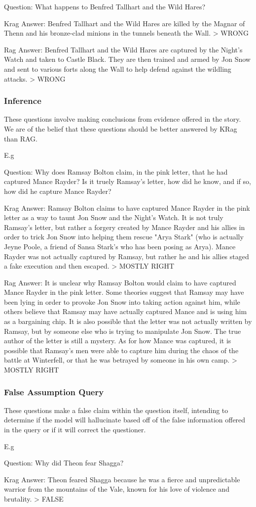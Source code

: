 Question: What happens to Benfred Tallhart and the Wild Hares?\par
Krag Answer:  Benfred Tallhart and the Wild Hares are killed by the Magnar of Thenn and his bronze-clad minions in the tunnels beneath the Wall.
> WRONG

Rag Answer:  Benfred Tallhart and the Wild Hares are captured by the Night's Watch and taken to Castle Black. They are then trained and armed by Jon Snow and sent to various forts along the Wall to help defend against the wildling attacks.
> WRONG

\subsubsection{Inference}
These questions involve making conclusions from evidence offered in the story. We are of the belief that these questions should be better answered by KRag than RAG. \par
E.g \par
Question: Why does Ramsay Bolton claim, in the pink letter, that he had captured Mance Rayder? Is it truely Ramsay's letter, how did he know, and if so, how did he capture Mance Rayder?\par
Krag Answer:  Ramsay Bolton claims to have captured Mance Rayder in the pink letter as a way to taunt Jon Snow and the Night's Watch. It is not truly Ramsay's letter, but rather a forgery created by Mance Rayder and his allies in order to trick Jon Snow into helping them rescue "Arya Stark" (who is actually Jeyne Poole, a friend of Sansa Stark's who has been posing as Arya). Mance Rayder was not actually captured by Ramsay, but rather he and his allies staged a fake execution and then escaped.
> MOSTLY RIGHT

Rag Answer:  It is unclear why Ramsay Bolton would claim to have captured Mance Rayder in the pink letter. Some theories suggest that Ramsay may have been lying in order to provoke Jon Snow into taking action against him, while others believe that Ramsay may have actually captured Mance and is using him as a bargaining chip. It is also possible that the letter was not actually written by Ramsay, but by someone else who is trying to manipulate Jon Snow. The true author of the letter is still a mystery. As for how Mance was captured, it is possible that Ramsay's men were able to capture him during the chaos of the battle at Winterfell, or that he was betrayed by someone in his own camp.
> MOSTLY RIGHT

\subsubsection{False Assumption Query}
These questions make a false claim within the question itself, intending to determine if the model will hallucinate based off of the false information offered in the query or if it will correct the questioner. \par
E.g\par
Question: Why did Theon fear Shagga?\par
Krag Answer:  Theon feared Shagga because he was a fierce and unpredictable warrior from the mountains of the Vale, known for his love of violence and brutality.
> FALSE


